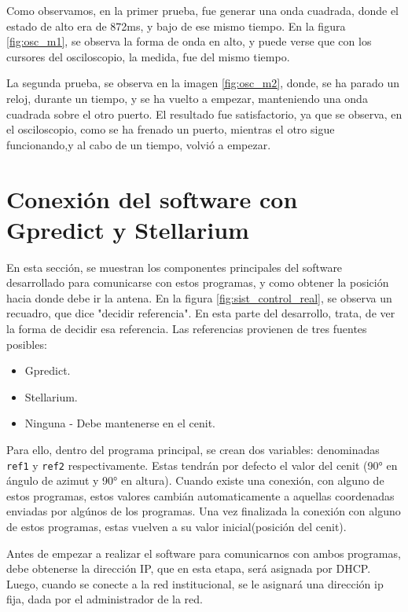 Como observamos, en la primer prueba, fue generar una onda cuadrada, donde el estado de alto era de 872ms, y bajo de ese mismo tiempo. En la figura \ref{fig:osc_m1}, se observa la forma de onda en alto, y puede verse que con los cursores del osciloscopio, la medida, fue del mismo tiempo. 


La segunda prueba, se observa en la imagen \ref{fig:osc_m2}, donde, se ha parado un reloj, durante un tiempo, y se ha vuelto a empezar, manteniendo una onda cuadrada sobre el otro puerto. El resultado fue satisfactorio, ya que se observa, en el osciloscopio, como se ha frenado un puerto, mientras el otro sigue funcionando,y al cabo de un tiempo, volvió a empezar.  
 

\section{Conexión del software con Gpredict y Stellarium} 

En esta sección, se muestran los componentes principales del software desarrollado para comunicarse con estos programas, y como obtener la posición hacia donde debe ir la antena. En la figura \ref{fig:sist_control_real}, se observa un recuadro, que dice "decidir referencia". En esta parte del desarrollo, trata, de ver la forma de decidir esa referencia. Las referencias provienen de tres fuentes posibles: 
\begin{itemize}
	\item Gpredict.  
	\item Stellarium. 
	\item Ninguna - Debe mantenerse en el cenit.
\end{itemize} 

Para ello, dentro del programa principal, se crean dos variables: denominadas \texttt{ref1} y \texttt{ref2} respectivamente. Estas tendrán por defecto el valor del cenit (90° en ángulo de azimut y 90° en altura). Cuando existe una conexión, con alguno de estos programas, estos valores cambián automaticamente a aquellas coordenadas enviadas por algúnos de los programas. Una vez finalizada la conexión con alguno de estos programas, estas vuelven a su valor inicial(posición del cenit). 

Antes de empezar a realizar el software para comunicarnos con ambos programas, debe obtenerse la dirección IP, que en esta etapa, será asignada por DHCP. Luego, cuando se conecte a la red institucional, se le asignará una dirección ip fija, dada por el administrador de la red. 


